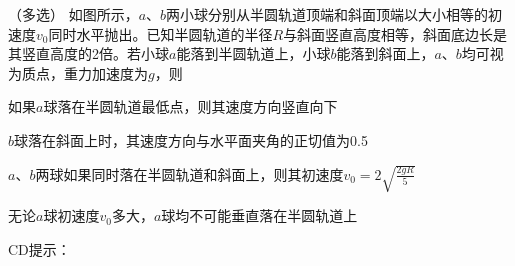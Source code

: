 （多选）
如图所示，\(a\)、\(b\)两小球分别从半圆轨道顶端和斜面顶端以大小相等的初速度\(v_0\)同时水平抛出。已知半圆轨道的半径\(R\)与斜面竖直高度相等，斜面底边长是其竖直高度的2倍。若小球\(a\)能落到半圆轨道上，小球\(b\)能落到斜面上，\(a\)、\(b\)均可视为质点，重力加速度为\(g\)，则\paren[]

\begin{choices}
	\item 如果\(a\)球落在半圆轨道最低点，则其速度方向竖直向下
	\item \(b\)球落在斜面上时，其速度方向与水平面夹角的正切值为0.5
	\item \(a\)、\(b\)两球如果同时落在半圆轨道和斜面上，则其初速度\(v_0 = 2\sqrt{\frac{2gR}{5}}\)
	\item 无论\(a\)球初速度\(v_0\)多大，\(a\)球均不可能垂直落在半圆轨道上
\end{choices}
\begin{answer}
	CD\qquad 提示：
\end{answer}
